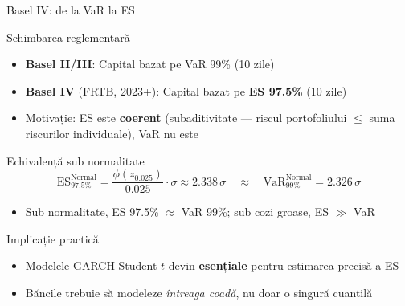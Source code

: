 \documentclass[9pt, aspectratio=169, t]{beamer}
\begin{document}
\begin{frame}{Basel IV: de la VaR la ES}
    \small
        \vspace{-0.3cm}
        \begin{block}{Schimbarea reglementară}
            \begin{itemize}
                \item \textbf{Basel II/III}: Capital bazat pe VaR 99\% (10 zile)
                \item \textbf{Basel IV} (FRTB, 2023+): Capital bazat pe \textbf{ES 97.5\%} (10 zile)
                \item Motivație: ES este \textbf{coerent} (subaditivitate --- riscul portofoliului $\leq$ suma riscurilor individuale), VaR nu este
            \end{itemize}
        \end{block}
        \vspace{-0.15cm}
        \begin{exampleblock}{Echivalență sub normalitate}
            \[
                \text{ES}_{97.5\%}^{\text{Normal}} = \frac{\phi(z_{0.025})}{0.025} \cdot \sigma \approx 2.338\,\sigma \quad \approx \quad \text{VaR}_{99\%}^{\text{Normal}} = 2.326\,\sigma
            \]
            \vspace{-0.3cm}
            \begin{itemize}
                \item Sub normalitate, ES 97.5\% $\approx$ VaR 99\%; sub cozi groase, ES $\gg$ VaR
            \end{itemize}
        \end{exampleblock}
        \vspace{-0.15cm}
        \begin{alertblock}{Implicație practică}
            \begin{itemize}
                \item Modelele GARCH Student-$t$ devin \textbf{esențiale} pentru estimarea precisă a ES
                \item Băncile trebuie să modeleze \textit{întreaga coadă}, nu doar o singură cuantilă
            \end{itemize}
        \end{alertblock}
\end{frame}

\end{document}

